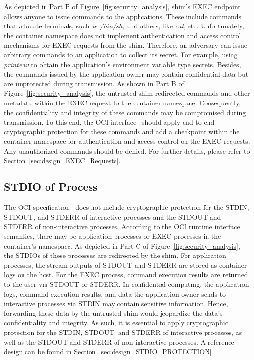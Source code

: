As depicted in Part B of Figure~\ref{fig:security_analysis}, shim's EXEC endpoint allows anyone to issue commands to the applications. These include commands that allocate terminals, such as \emph{/bin/sh}, and others, like \emph{cat}, etc. Unfortunately, the container namespace does not implement authentication and access control mechanisms for EXEC requests from 
the shim. Therefore, an adversary can issue arbitrary commands to an application to collect its secret. For example, using \emph{printenv} to obtain the application's environment variable type secrets. Besides, the commands issued by the application owner may contain confidential data but are unprotected during transmission. As shown in Part B of Figure~\ref{fig:security_analysis}, the untrusted 
shim redirected commands and other metadata within the EXEC request to the container namespace. Consequently, the confidentiality and integrity of these commands may be compromised during transmission. To this end, the OCI interface~\cite*{oci-runtime-spec} should apply end-to-end cryptographic protection for these commands and add a checkpoint within the 
container namespace for authentication and access control on the EXEC requests. Any unauthorized commands should be denied. For further details, please refer to Section~\ref{sec:design_EXEC_Requests}.


\subsection{STDIO of Process}
\label{sec:security_analyse_STDIO_oci}
The OCI specification~\cite*{oci-runtime-spec} does not include cryptographic protection for the STDIN, STDOUT, and STDERR  of interactive processes and the STDOUT and STDERR of non-interactive processes. According to the OCI runtime interface semantics, there may be application processes or EXEC processes in the container's namespace. As depicted in Part C of 
Figure~\ref{fig:security_analysis}, the STDIOs of these processes are redirected by the shim. For application processes, the stream outputs of STDOUT and STDERR are stored as container logs on the host. For the EXEC process, command execution results are returned to the user via STDOUT or STDERR. In confidential computing, the application logs, command execution 
results, and data the application owner sends to interactive processes via STDIN may contain sensitive information. Hence, forwarding these data by the untrusted shim would jeopardize the data's confidentiality and integrity. As such, it is essential to apply cryptographic protection for the STDIN, STDOUT, and STDERR of interactive processes, as well as 
the STDOUT and STDERR of non-interactive processes. A reference design can be found in Section~\ref{sec:design_STDIO_PROTECTION}

